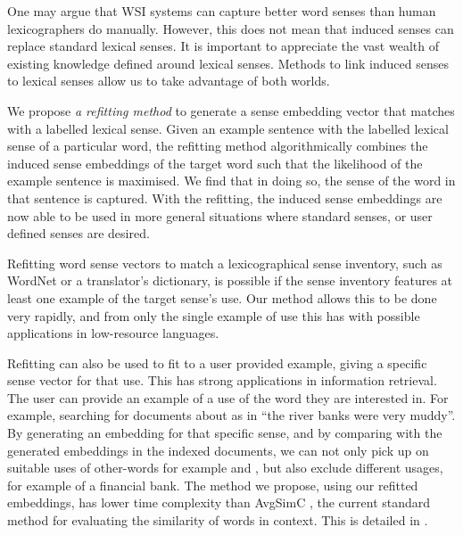 {One may argue that WSI systems can capture better word senses than human lexicographers do manually.
However, this does not mean that induced senses can replace standard lexical senses.
It is important to appreciate the vast wealth of existing knowledge defined around lexical senses.
Methods to link induced senses to lexical senses allow us to take advantage of both worlds.


We propose \emph{a refitting method} to generate a sense embedding vector that matches with a labelled lexical sense.
Given an example sentence with the labelled lexical sense of a particular word, the refitting method algorithmically combines the induced sense embeddings of the target word such that the likelihood of the example sentence is maximised.
We find that in doing so, the sense of the word in that sentence is captured.
With the refitting, the induced sense embeddings are now able to be used in more general situations where standard senses, or user defined senses are desired.

Refitting word sense vectors to match a lexicographical sense inventory, such as WordNet or a translator's dictionary, is possible if the sense inventory features at least one example of the target sense's use.
Our method allows this to be done very rapidly, and from only the single example of use this has with possible applications in low-resource languages.

Refitting can also be used to fit to a user provided example, giving a specific sense vector for that use.
This has strong applications in information retrieval.
The user can provide an example of a use of the word they are interested in.
For example, searching for documents about 
 as in \enquote{the river banks were very muddy}.
By generating an embedding for that specific sense, and by comparing with the generated embeddings in the indexed documents, we can not only pick up on suitable uses of other-words for example  and ,
but also exclude different usages, for example of a financial bank.
The method we propose, using our refitted embeddings, has lower time complexity than AvgSimC \parencite{Reisinger2010}, the current standard method for evaluating the similarity of words in context.
This is detailed in .


}

